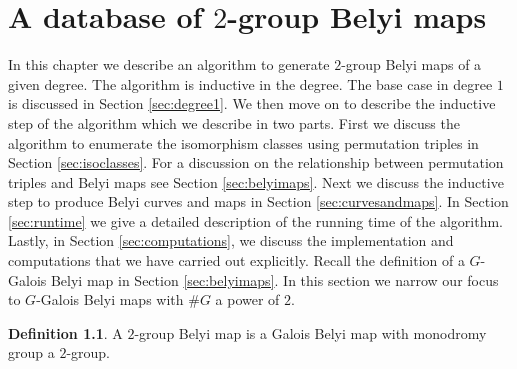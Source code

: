 \documentclass{dcthesis}
\newcommand{\defi}[1]{\textsf{#1}}
\theoremstyle{definition}
\newtheorem{definition}[prop]{Definition}
\theoremstyle{remark}
\numberwithin{equation}{section}
\numberwithin{figure}{section}
\begin{document}
\chapter{A database of $2$-group Belyi maps}{\label{chapter:database}
  In this chapter we describe an algorithm
  to generate $2$-group Belyi maps of a given degree.
  The algorithm is inductive in the degree.
  The base case in degree $1$ is discussed in Section \ref{sec:degree1}.
  We then move on to describe the inductive step of the algorithm
  which we describe in two parts.
  First we discuss the algorithm to enumerate the isomorphism classes
  using permutation triples in Section \ref{sec:isoclasses}.
  For a discussion on the relationship between permutation triples and Belyi maps
  see Section \ref{sec:belyimaps}.
  Next we discuss the inductive step to produce Belyi curves and maps in Section \ref{sec:curvesandmaps}.
  In Section \ref{sec:runtime} we give a detailed description of the running time of the algorithm.
  Lastly,
  in Section \ref{sec:computations},
  we discuss the implementation and computations that we have carried out explicitly.
  Recall the definition of a $G$-Galois Belyi map in Section \ref{sec:belyimaps}.
  In this section we narrow our focus
  to $G$-Galois Belyi maps with $\#G$ a power of $2$.
  \begin{definition}\label{def:2groupbelyi}
    A \defi{$2$-group Belyi map} is a Galois Belyi map
    with monodromy group a $2$-group.
  \end{definition}
}
\end{document}
